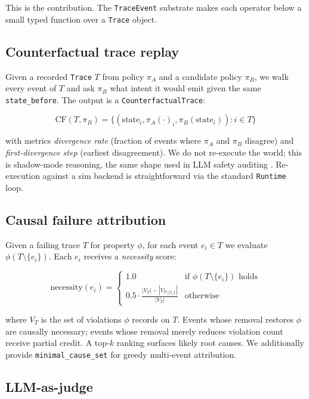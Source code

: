 \documentclass[11pt]{article}
\begin{document}
This is the contribution. The \texttt{TraceEvent} substrate makes
each operator below a small typed function over a \texttt{Trace}
object.

\subsection{Counterfactual trace replay}
\label{sec:counterfactual}

Given a recorded \texttt{Trace} $T$ from policy $\pi_A$ and a
candidate policy $\pi_B$, we walk every event of $T$ and ask
$\pi_B$ what intent it would emit given the same
\texttt{state\_before}. The output is a \texttt{Counterfactual\-Trace}:

\[
  \text{CF}(T, \pi_B) = \{(\text{state}_i, \pi_A(\cdot)_i, \pi_B(\text{state}_i)) : i \in T\}
\]

with metrics \emph{divergence rate} (fraction of events where
$\pi_A$ and $\pi_B$ disagree) and \emph{first-divergence step}
(earliest disagreement). We do not re-execute the world; this is
shadow-mode reasoning, the same shape used in LLM safety auditing
\citep{anthropic2024sleeper}. Re-execution against a sim backend
is straightforward via the standard \texttt{Runtime} loop.

\subsection{Causal failure attribution}
\label{sec:causal}

Given a failing trace $T$ for property $\phi$, for each event
$e_i \in T$ we evaluate $\phi(T \setminus \{e_i\})$. Each
$e_i$ receives a \emph{necessity} score:

\[
  \text{necessity}(e_i) = \begin{cases}
    1.0 & \text{if } \phi(T \setminus \{e_i\}) \text{ holds} \\
    0.5 \cdot \frac{|V_T| - |V_{T \setminus \{e_i\}}|}{|V_T|} & \text{otherwise}
  \end{cases}
\]

where $V_T$ is the set of violations $\phi$ records on $T$. Events
whose removal restores $\phi$ are causally necessary; events whose
removal merely reduces violation count receive partial credit. A
top-$k$ ranking surfaces likely root causes. We additionally
provide \texttt{minimal\_cause\_set} for greedy multi-event
attribution.

\subsection{LLM-as-judge}
\label{sec:judge}
\end{document}
